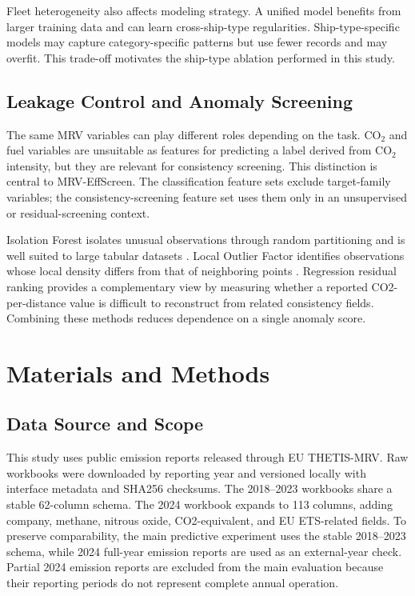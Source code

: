 \documentclass[preprints,article,submit,pdftex,oneauthor]{Definitions/mdpi}
\begin{document}
Fleet heterogeneity also affects modeling strategy. A unified model benefits from larger training data and can learn cross-ship-type regularities. Ship-type-specific models may capture category-specific patterns but use fewer records and may overfit. This trade-off motivates the ship-type ablation performed in this study.

\subsection{Leakage Control and Anomaly Screening}

The same MRV variables can play different roles depending on the task. CO$_2$ and fuel variables are unsuitable as features for predicting a label derived from CO$_2$ intensity, but they are relevant for consistency screening. This distinction is central to MRV-EffScreen. The classification feature sets exclude target-family variables; the consistency-screening feature set uses them only in an unsupervised or residual-screening context.

Isolation Forest isolates unusual observations through random partitioning and is well suited to large tabular datasets \cite{liu2008isolation_forest}. Local Outlier Factor identifies observations whose local density differs from that of neighboring points \cite{breunig2000lof}. Regression residual ranking provides a complementary view by measuring whether a reported CO2-per-distance value is difficult to reconstruct from related consistency fields. Combining these methods reduces dependence on a single anomaly score.

\section{Materials and Methods}

\subsection{Data Source and Scope}

This study uses public emission reports released through EU THETIS-MRV. Raw workbooks were downloaded by reporting year and versioned locally with interface metadata and SHA256 checksums. The 2018--2023 workbooks share a stable 62-column schema. The 2024 workbook expands to 113 columns, adding company, methane, nitrous oxide, CO2-equivalent, and EU ETS-related fields. To preserve comparability, the main predictive experiment uses the stable 2018--2023 schema, while 2024 full-year emission reports are used as an external-year check. Partial 2024 emission reports are excluded from the main evaluation because their reporting periods do not represent complete annual operation.
\end{document}
